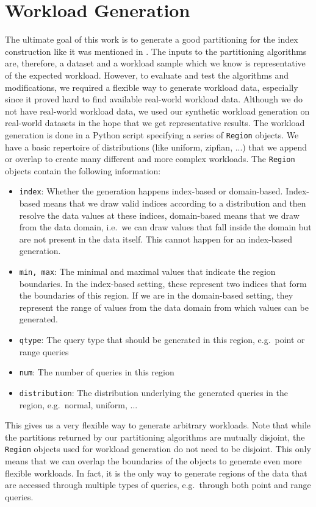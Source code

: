 \section{Workload Generation} \label{sec:wklgeneration}
The ultimate goal of this work is to generate a good partitioning for the index construction like it was mentioned in . The inputs to the partitioning algorithms are, therefore, a dataset and a workload sample which we know is representative of the expected workload. However, to evaluate and test the algorithms and modifications, we required a flexible way to generate workload data, especially since it proved hard to find available real-world workload data. Although we do not have real-world workload data, we used our synthetic workload generation on real-world datasets in the hope that we get representative results. The workload generation is done in a Python script specifying a series of \verb|Region| objects. We have a basic repertoire of distributions (like uniform, zipfian, ...) that we append or overlap to create many different and more complex workloads. The \verb|Region| objects contain the following information:

\begin{itemize}
    \item \verb|index|: Whether the generation happens index-based or domain-based. Index-based means that we draw valid indices according to a distribution and then resolve the data values at these indices, domain-based means that we draw from the data domain, i.e.~we can draw values that fall inside the domain but are not present in the data itself. This cannot happen for an index-based generation.
    \item \verb|min, max|: The minimal and maximal values that indicate the region boundaries. In the index-based setting, these represent two indices that form the boundaries of this region. If we are in the domain-based setting, they represent the range of values from the data domain from which values can be generated.
    \item \verb|qtype|: The query type that should be generated in this region, e.g.~point or range queries
    \item \verb|num|: The number of queries in this region
    \item \verb|distribution|: The distribution underlying the generated queries in the region, e.g.~normal, uniform, ...
\end{itemize}

This gives us a very flexible way to generate arbitrary workloads. Note that while the partitions returned by our partitioning algorithms are mutually disjoint, the \verb|Region| objects used for workload generation do not need to be disjoint. This only means that we can overlap the boundaries of the objects to generate even more flexible workloads. In fact, it is the only way to generate regions of the data that are accessed through multiple types of queries, e.g.~through both point and range queries. 

